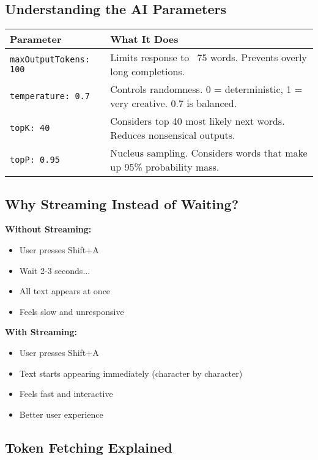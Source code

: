 \documentclass[11pt,a4paper]{article}
\begin{document}
\subsection{Understanding the AI Parameters}

\begin{table}[h]
\centering
\begin{tabular}{|l|p{8cm}|}
\hline
\textbf{Parameter} & \textbf{What It Does} \\
\hline
\texttt{maxOutputTokens: 100} & Limits response to ~75 words. Prevents overly long completions. \\
\hline
\texttt{temperature: 0.7} & Controls randomness. 0 = deterministic, 1 = very creative. 0.7 is balanced. \\
\hline
\texttt{topK: 40} & Considers top 40 most likely next words. Reduces nonsensical outputs. \\
\hline
\texttt{topP: 0.95} & Nucleus sampling. Considers words that make up 95\% probability mass. \\
\hline
\end{tabular}
\end{table}

\subsection{Why Streaming Instead of Waiting?}

\textbf{Without Streaming:}
\begin{itemize}
    \item User presses Shift+A
    \item Wait 2-3 seconds...
    \item All text appears at once
    \item Feels slow and unresponsive
\end{itemize}

\textbf{With Streaming:}
\begin{itemize}
    \item User presses Shift+A
    \item Text starts appearing immediately (character by character)
    \item Feels fast and interactive
    \item Better user experience
\end{itemize}

\subsection{Token Fetching Explained}
\end{document}
